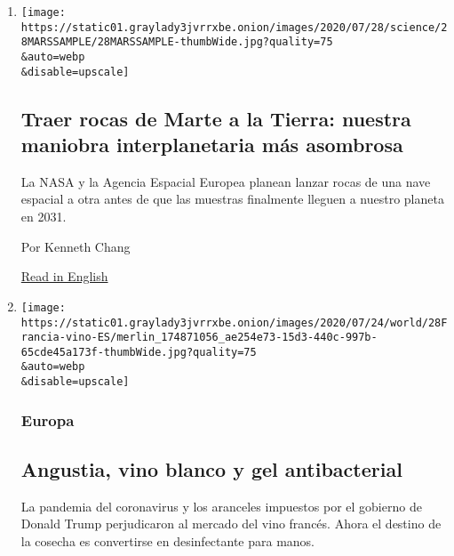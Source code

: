 \begin{enumerate}
\def\labelenumi{\arabic{enumi}.}
\item
  \href{/es/2020/07/29/espanol/ciencia-y-tecnologia/mision-marte-nasa.html}{}

  \texttt{[image: https://static01.graylady3jvrrxbe.onion/images/2020/07/28/science/28MARSSAMPLE/28MARSSAMPLE-thumbWide.jpg?quality=75\\\&auto=webp\\\&disable=upscale]}

  \hypertarget{traer-rocas-de-marte-a-la-tierra-nuestra-maniobra-interplanetaria-muxe1s-asombrosa}{%
  \subsection{Traer rocas de Marte a la Tierra: nuestra maniobra
  interplanetaria más
  asombrosa}\label{traer-rocas-de-marte-a-la-tierra-nuestra-maniobra-interplanetaria-muxe1s-asombrosa}}

  La NASA y la Agencia Espacial Europea planean lanzar rocas de una nave
  espacial a otra antes de que las muestras finalmente lleguen a nuestro
  planeta en 2031.

  Por Kenneth Chang

  \href{https://www.nytimes3xbfgragh.onion/2020/07/28/science/mars-sample-return-mission.html}{Read
  in English}
\item
  \href{/es/2020/07/28/espanol/mundo/vino-blanco-alsacia-coronavirus.html}{}

  \texttt{[image: https://static01.graylady3jvrrxbe.onion/images/2020/07/24/world/28Francia-vino-ES/merlin\_174871056\_ae254e73-15d3-440c-997b-65cde45a173f-thumbWide.jpg?quality=75\\\&auto=webp\\\&disable=upscale]}

  \hypertarget{europa}{%
  \subsubsection{Europa}\label{europa}}

  \hypertarget{angustia-vino-blanco-y-gel-antibacterial}{%
  \subsection{Angustia, vino blanco y gel
  antibacterial}\label{angustia-vino-blanco-y-gel-antibacterial}}

  La pandemia del coronavirus y los aranceles impuestos por el gobierno
  de Donald Trump perjudicaron al mercado del vino francés. Ahora el
  destino de la cosecha es convertirse en desinfectante para manos.


\end{enumerate}
